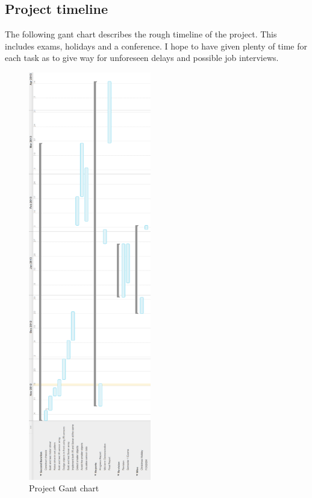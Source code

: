 \documentclass[11pt,fleqn,twoside]{article}
\begin{document}
\subsection{Project timeline}
The following gant chart describes the rough timeline of the project.  This includes exams, holidays and a conference.  I hope to have given plenty of time for each task as to give way for unforeseen delays and possible job interviews.
\begin{figure}[h]
\centering
        \includegraphics[width=2.1in] {figures/gant-v.png}
        \caption{Project Gant chart}
        \label{Project Gant chart}
\end{figure}
\clearpage

\nocite{*} %

\newpage
{}
\end{document}
